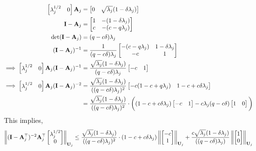 \begin{align*}
\begin{bmatrix}\lambda_j^{1/2}&0\end{bmatrix}\mathbf{A}_j&=\begin{bmatrix}0&\sqrt{\lambda_j}(1-\delta\lambda_j)\end{bmatrix}\\
\mathbf{I}-\mathbf{A}_j&=\begin{bmatrix}1&-(1-\delta\lambda_j)\\c&-(c-q \lambda_j)\end{bmatrix}\\
\det(\mathbf{I}-\mathbf{A}_j)&=(q -c\delta)\lambda_j\\
(\mathbf{I}-\mathbf{A}_j)^{-1}&=\frac{1}{(q -c\delta)\lambda_j}\begin{bmatrix}-(c-q \lambda_j)&1-\delta\lambda_j\\-c&1\end{bmatrix}\\
\implies\begin{bmatrix}\lambda_j^{1/2}&0\end{bmatrix}\mathbf{A}_j(\mathbf{I}-\mathbf{A}_j)^{-1}&=\frac{\sqrt{\lambda_j}(1-\delta\lambda_j)}{(q -c\delta)\lambda_j}\begin{bmatrix}-c&1\end{bmatrix}\\
\implies\begin{bmatrix}\lambda_j^{1/2}&0\end{bmatrix}\mathbf{A}_j(\mathbf{I}-\mathbf{A}_j)^{-2}&=\frac{\sqrt{\lambda_j}(1-\delta\lambda_j)}{((q -c\delta)\lambda_j)^2}\begin{bmatrix}-c(1-c+q \lambda_j)&1-c+c\delta\lambda_j\end{bmatrix}\\
&=\frac{\sqrt{\lambda_j}(1-\delta\lambda_j)}{((q -c\delta)\lambda_j)^2}\cdot\bigg((1-c+c\delta\lambda_j)\begin{bmatrix}-c&1\end{bmatrix} - c\lambda_j(q -c\delta)\begin{bmatrix}1&0\end{bmatrix}   \bigg)
\end{align*}
This implies,
\begin{align}
\label{eq:lotp2}
\left\lVert(\mathbf{I}-\mathbf{A}_j^{\top})^{-2}\mathbf{A}_j^{\top}\begin{bmatrix}\lambda_j^{1/2}\\0\end{bmatrix}\right\rVert_{\mathbf{U}_j}\leq\frac{\sqrt{\lambda_j}(1-\delta\lambda_j)}{((q -c\delta)\lambda_j)^2}\cdot(1-c+c\delta\lambda_j)\left\lVert\begin{bmatrix}-c\\1\end{bmatrix}\right\rVert_{\mathbf{U}_j}+\frac{c\sqrt{\lambda_j}(1-\delta\lambda_j)}{((q -c\delta)\lambda_j)}\left\lVert\begin{bmatrix}1\\0\end{bmatrix}\right\rVert_{\mathbf{U}_j}
\end{align}
